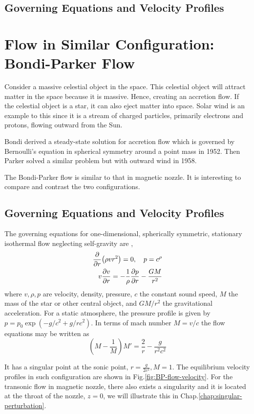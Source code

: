 \subsection{Governing Equations and Velocity Profiles}

\section{Flow in Similar Configuration: Bondi-Parker Flow}
Consider a massive celestial object in the space. This celestial object will attract matter in the space because it is massive. Hence, creating an accretion flow. If the celestial object is a star, it can also eject matter into space. Solar wind is an example to this since it is a stream of charged particles, primarily electrons and protons, flowing outward from the Sun.

Bondi derived a steady-state solution for accretion flow which is governed by Bernoulli's equation in spherical symmetry around a point mass in 1952. Then Parker solved a similar problem but with outward wind in 1958. \cite{aikawa_stability_1979,bondi_spherically_1952,keto_stability_2020}

The Bondi-Parker flow is similar to that in magnetic nozzle. It is interesting to compare and contrast the two configurations.

\subsection{Governing Equations and Velocity Profiles}
The governing equations for one-dimensional, spherically symmetric, stationary isothermal flow neglecting self-gravity are \cite{velli_hydrodynamics_2001},
\begin{align*} \label{eq:bondi-parker}
	\pdv{r}(\rho vr^2) = 0, \quad p = c^\rho \\
	v\pdv{v}{r} = -\frac{1}{\rho}\pdv{p}{r} - \frac{GM}{r^2}
\end{align*}
where $v,\rho,p$ are velocity, density, pressure, $c$ the constant sound speed, $M$ the mass of the star or other central object, and $GM/r^2$ the gravitational acceleration. For a static atmosphere, the pressure profile is given by $p=p_0\exp(-g/c^2 + g/rc^2)$. In terms of mach number $M=v/c$ the flow equations may be written as
\[ \left(M - \frac{1}{M}\right)M' = \frac{2}{r} - \frac{g}{r^2c^2} \]

It has a singular point at the sonic point, $r=\frac{g}{2c^2}, M=1$. The equilibrium velocity profiles in such configuration are shown in Fig.\ref{fig:BP-flow-velocity}. For the transonic flow in magnetic nozzle, there also exists a singularity and it is located at the throat of the nozzle, $z=0$, we will illustrate this in Chap.\ref{chap:singular-perturbation}.

